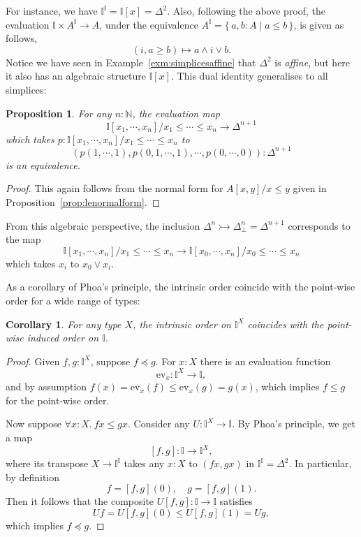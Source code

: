 \documentclass[12pt]{amsart}
\newtheorem{corollary}[theorem]{Corollary}
\newtheorem{proposition}[theorem]{Proposition}
\theoremstyle{definition}
\newcommand{\mbb}[1]{\mathbb{#1}}
\newcommand{\I}{\mbb I}
\newcommand{\ev}{\mathrm{ev}}
\newcommand{\scomp}[2]{\{\,#1\mid#2\,\}}
\newcommand{\inj}{\rightarrowtail}
\newcommand{\N}{\mbb N}
\newcommand{\prt}{_{\bot}}
\newcommand{\fa}[2]{\forall #1\!\colon\!\!#2.\ }
\begin{document}
For instance, we have $\I^\I = \I[x] = \Delta^2$. Also, following the above proof, the evaluation $\I \times A^\I \to A$, under the equivalence $A^\I = \scomp{a,b:A}{a \le b}$, is given as follows,
\[ (i,a \ge b) \mapsto a \wedge i \vee b. \]
Notice we have seen in Example~\ref{exm:simplicesaffine} that $\Delta^2$ is \emph{affine}, but here it also has an algebraic structure $\I[x]$. This dual identity generalises to all simplices:

\begin{proposition}\label{prop:simplicesasalgebra}
  For any $n : \N$, the evaluation map
  \[ \I[x_1,\cdots,x_n]/x_1\le\cdots\le x_n \to \Delta^{n+1} \]
  which takes $p:\I[x_1,\cdots,x_n]/x_1\le\cdots\le x_n$ to 
  \[ (p(1,\cdots,1),p(0,1,\cdots,1),\cdots,p(0,\cdots,0)) : \Delta^{n+1} \]
  is an equivalence.
\end{proposition}
\begin{proof}
  This again follows from the normal form for $A[x,y]/x\le y$ given in Proposition~\ref{prop:lenormalform}.
\end{proof}

From this algebraic perspective, the inclusion $\Delta^n \inj \Delta^n\prt = \Delta^{n+1}$ corresponds to the map
\[ \I[x_1,\cdots,x_n]/x_1\le\cdots\le x_n \to \I[x_0,\cdots,x_n]/x_0\le\cdots\le x_n \]
which takes $x_i$ to $x_0 \vee x_i$.

As a corollary of Phoa's principle, the intrinsic order coincide with the point-wise order for a wide range of types:

\begin{corollary}
  For any type $X$, the intrinsic order on $\I^X$ coincides with the point-wise induced order on $\I$.
\end{corollary}
\begin{proof}
  Given $f,g : \I^X$, suppose $f \preceq g$. For $x:X$ there is an evaluation function
  \[ \ev_x : \I^X \to \I, \]
  and by assumption $f(x) = \ev_x(f) \le \ev_x(g) = g(x)$, which implies $f \le g$ for the point-wise order.

  Now suppose $\fa xX fx \le gx$. Consider any $U : \I^X \to \I$. By Phoa's principle, we get a map
  \[ [f,g] : \I \to \I^X, \]
  where its transpose $X \to \I^\I$ takes any $x:X$ to $(fx,gx)$ in $\I^\I = \Delta^2$. In particular, by definition
  \[ f = [f,g](0), \quad g = [f,g](1). \]
  Then it follows that the composite $U[f,g] : \I \to \I$ satisfies
  \[ Uf = U[f,g](0) \le U[f,g](1) = Ug, \]
  which implies $f \preceq g$.
\end{proof}
\end{document}
